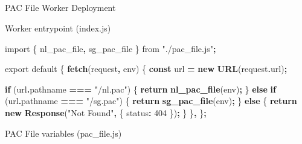 \documentclass[
]{article}
\makeatletter
\let\oldsubparagraph\subparagraph
\renewcommand{\subparagraph}{
    \@ifstar
      \xxxSubParagraphStar
      \xxxSubParagraphNoStar
  }
\newcommand{\xxxSubParagraphStar}[1]{\oldsubparagraph*{#1}\mbox{}}
\newcommand{\xxxSubParagraphNoStar}[1]{\oldsubparagraph{#1}\mbox{}}
\newenvironment{Shaded}{\begin{snugshade}}{\end{snugshade}}
\newcommand{\AttributeTok}[1]{\textcolor[rgb]{0.13,0.29,0.53}{#1}}
\newcommand{\ControlFlowTok}[1]{\textcolor[rgb]{0.13,0.29,0.53}{\textbf{#1}}}
\newcommand{\DataTypeTok}[1]{\textcolor[rgb]{0.13,0.29,0.53}{#1}}
\newcommand{\DecValTok}[1]{\textcolor[rgb]{0.00,0.00,0.81}{#1}}
\newcommand{\FunctionTok}[1]{\textcolor[rgb]{0.13,0.29,0.53}{\textbf{#1}}}
\newcommand{\ImportTok}[1]{#1}
\newcommand{\KeywordTok}[1]{\textcolor[rgb]{0.13,0.29,0.53}{\textbf{#1}}}
\newcommand{\NormalTok}[1]{#1}
\newcommand{\OperatorTok}[1]{\textcolor[rgb]{0.81,0.36,0.00}{\textbf{#1}}}
\newcommand{\StringTok}[1]{\textcolor[rgb]{0.31,0.60,0.02}{#1}}
\makeatother
\begin{document}
\subparagraph{PAC File Worker
Deployment}\label{pac-file-worker-deployment}

Worker entrypoint (index.js)

\begin{Shaded}
\begin{Highlighting}[numbers=left,,]
\ImportTok{import}\NormalTok{ \{ nl\_pac\_file}\OperatorTok{,}\NormalTok{ sg\_pac\_file \} }\ImportTok{from} \StringTok{"./pac\_file.js"}\OperatorTok{;}
 
\ImportTok{export} \ImportTok{default}\NormalTok{ \{}
  \FunctionTok{fetch}\NormalTok{(request}\OperatorTok{,}\NormalTok{ env) \{}
    \KeywordTok{const}\NormalTok{ url }\OperatorTok{=} \KeywordTok{new} \FunctionTok{URL}\NormalTok{(request}\OperatorTok{.}\AttributeTok{url}\NormalTok{)}\OperatorTok{;}
 
    \ControlFlowTok{if}\NormalTok{ (url}\OperatorTok{.}\AttributeTok{pathname} \OperatorTok{===} \StringTok{"/nl.pac"}\NormalTok{) \{}
      \ControlFlowTok{return} \FunctionTok{nl\_pac\_file}\NormalTok{(env)}\OperatorTok{;}
\NormalTok{    \} }\ControlFlowTok{else} \ControlFlowTok{if}\NormalTok{ (url}\OperatorTok{.}\AttributeTok{pathname} \OperatorTok{===} \StringTok{"/sg.pac"}\NormalTok{) \{}
      \ControlFlowTok{return} \FunctionTok{sg\_pac\_file}\NormalTok{(env)}\OperatorTok{;}
\NormalTok{    \} }\ControlFlowTok{else}\NormalTok{ \{}
      \ControlFlowTok{return} \KeywordTok{new} \FunctionTok{Response}\NormalTok{(}\StringTok{"Not Found"}\OperatorTok{,}\NormalTok{ \{ }\DataTypeTok{status}\OperatorTok{:} \DecValTok{404}\NormalTok{ \})}\OperatorTok{;}
\NormalTok{    \}}
\NormalTok{  \}}\OperatorTok{,}
\NormalTok{\}}\OperatorTok{;}
\end{Highlighting}
\end{Shaded}

\newpage{}

PAC File variables (pac\_file.js)
\end{document}
